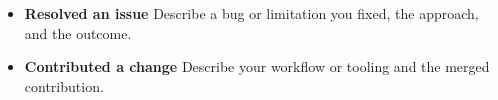 \begin{itemize}
  \item \textbf{Resolved an issue} Describe a bug or limitation you fixed, the approach, and the outcome.
  \item \textbf{Contributed a change} Describe your workflow or tooling and the merged contribution.
\end{itemize}

